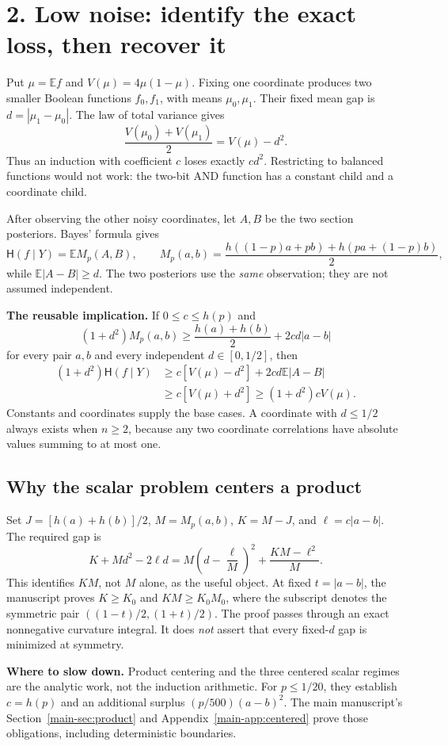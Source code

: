 \documentclass[11pt]{article}
\newcommand{\E}{\mathbb E}\newcommand{\Pp}{\mathbb P}\newcommand{\HH}{\mathsf H}\newcommand{\II}{\mathsf I}
\begin{document}
\newpage
\section*{2. Low noise: identify the exact loss, then recover it}
Put $\mu=\E f$ and $V(\mu)=4\mu(1-\mu)$. Fixing one coordinate produces two smaller Boolean functions $f_0,f_1$, with means $\mu_0,\mu_1$. Their fixed mean gap is $d=|\mu_1-\mu_0|$. The law of total variance gives
\[
 \frac{V(\mu_0)+V(\mu_1)}2=V(\mu)-d^2.
\]
Thus an induction with coefficient $c$ loses exactly $cd^2$. Restricting to balanced functions would not work: the two-bit AND function has a constant child and a coordinate child.

After observing the other noisy coordinates, let $A,B$ be the two section posteriors. Bayes' formula gives
\[
 \HH(f\mid Y)=\E M_p(A,B),\qquad
 M_p(a,b)=\frac{h((1-p)a+pb)+h(pa+(1-p)b)}2,
\]
while $\E|A-B|\ge d$. The two posteriors use the \emph{same} observation; they are not assumed independent.

\textbf{The reusable implication.} If $0\le c\le h(p)$ and
\[
 (1+d^2)M_p(a,b)\ge\frac{h(a)+h(b)}2+2cd|a-b|
\]
for every pair $a,b$ and every independent $d\in[0,1/2]$, then
\[
 \begin{aligned}
 (1+d^2)\HH(f\mid Y)
 &\ge c[V(\mu)-d^2]+2cd\E|A-B|\\
 &\ge c[V(\mu)+d^2]\ge(1+d^2)cV(\mu).
 \end{aligned}
\]
Constants and coordinates supply the base cases. A coordinate with $d\le1/2$ always exists when $n\ge2$, because any two coordinate correlations have absolute values summing to at most one.

\subsection*{Why the scalar problem centers a product}
Set $J=[h(a)+h(b)]/2$, $M=M_p(a,b)$, $K=M-J$, and $\ell=c|a-b|$. The required gap is
\[
 K+Md^2-2\ell d
 =M\left(d-\frac\ell M\right)^2+\frac{KM-\ell^2}{M}.
\]
This identifies $KM$, not $M$ alone, as the useful object. At fixed $t=|a-b|$, the manuscript proves $K\ge K_0$ and $KM\ge K_0M_0$, where the subscript denotes the symmetric pair $((1-t)/2,(1+t)/2)$. The proof passes through an exact nonnegative curvature integral. It does \emph{not} assert that every fixed-$d$ gap is minimized at symmetry.

\textbf{Where to slow down.} Product centering and the three centered scalar regimes are the analytic work, not the induction arithmetic. For $p\le1/20$, they establish $c=h(p)$ and an additional surplus $(p/500)(a-b)^2$. The main manuscript's Section~\ref{main-sec:product} and Appendix~\ref{main-app:centered} prove those obligations, including deterministic boundaries.
\end{document}
